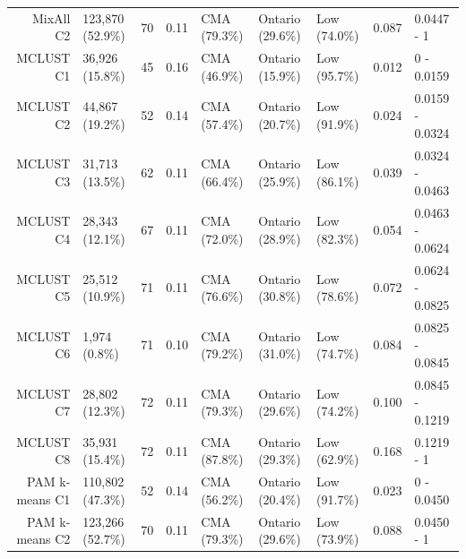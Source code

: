 \documentclass[11pt, a4paper]{article}
\begin{document}
\begin{table}[H]
{\begin{tabular}{|r|llllllll|}
  MixAll C2 & 123,870 (52.9\%) & 70 & 0.11 & CMA (79.3\%) & Ontario (29.6\%) & Low (74.0\%) & 0.087 & 0.0447 - 1 \\
\rowcolor{gray!25}  MCLUST C1 & 36,926 (15.8\%) & 45 & 0.16 & CMA (46.9\%) & Ontario (15.9\%) & Low (95.7\%) & 0.012 & 0 - 0.0159 \\
 \rowcolor{gray!25} MCLUST C2 & 44,867 (19.2\%) & 52 & 0.14 & CMA (57.4\%) & Ontario (20.7\%) & Low (91.9\%) & 0.024 & 0.0159 - 0.0324 \\
\rowcolor{gray!25}  MCLUST C3 & 31,713 (13.5\%) & 62 & 0.11 & CMA (66.4\%) & Ontario (25.9\%) & Low (86.1\%) & 0.039 & 0.0324 - 0.0463 \\
 \rowcolor{gray!25} MCLUST C4 & 28,343 (12.1\%) & 67 & 0.11 & CMA (72.0\%) & Ontario (28.9\%) & Low (82.3\%) & 0.054 & 0.0463 - 0.0624 \\
 \rowcolor{gray!25} MCLUST C5 & 25,512 (10.9\%) & 71 & 0.11 & CMA (76.6\%) & Ontario (30.8\%) & Low (78.6\%) & 0.072 & 0.0624 - 0.0825 \\
 \rowcolor{gray!25} MCLUST C6 & 1,974 (0.8\%) & 71 & 0.10 & CMA (79.2\%) & Ontario (31.0\%) & Low (74.7\%) & 0.084 & 0.0825 - 0.0845 \\
 \rowcolor{gray!25} MCLUST C7 & 28,802 (12.3\%) & 72 & 0.11 & CMA (79.3\%) & Ontario (29.6\%) & Low (74.2\%) & 0.100 & 0.0845 - 0.1219 \\
\rowcolor{gray!25}  MCLUST C8 & 35,931 (15.4\%) & 72 & 0.11 & CMA (87.8\%) & Ontario (29.3\%) & Low (62.9\%) & 0.168 & 0.1219 - 1 \\
  PAM k-means C1 & 110,802 (47.3\%) & 52 & 0.14 & CMA (56.2\%) & Ontario (20.4\%) & Low (91.7\%) & 0.023 & 0 - 0.0450 \\
  PAM k-means C2 & 123,266 (52.7\%) & 70 & 0.11 & CMA (79.3\%) & Ontario (29.6\%) & Low (73.9\%) & 0.088 & 0.0450 - 1 \\
   \hline
\end{tabular}
}
\end{table}
\end{document}
